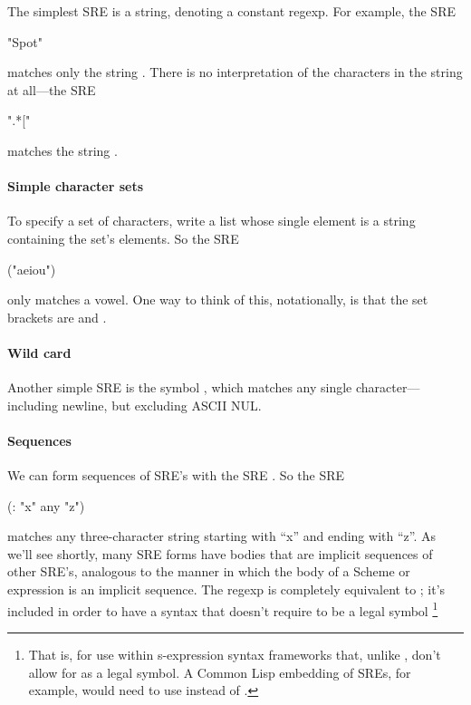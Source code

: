 The simplest SRE is a string, denoting a constant regexp. For example, the SRE
\begin{code}
    "Spot"\end{code}
%
matches only the string 
. 
There is no interpretation of the characters in the string at all---the SRE
\begin{code}
    ".*["\end{code}
%
matches the string .


\paragraph{Simple character sets}

To specify a set of characters, write a list whose single element is
a string containing the set's elements. So the SRE
\begin{code}
    ("aeiou")\end{code}
%
only matches a vowel. One way to think of this, notationally, is that the
set brackets are  and .


\paragraph{Wild card}

Another simple SRE is the symbol , 
which matches any single character---including newline, but excluding
ASCII NUL.


\paragraph{Sequences}

We can form sequences of SRE's with the SRE .
So the SRE
\begin{code}
    (: "x" any "z")\end{code}
%
matches any three-character string starting with ``x'' and ending with ``z''.
As we'll see shortly, many SRE forms have bodies that are implicit sequences of
other SRE's, analogous to the manner in which the body of a Scheme 
 or  expression is an implicit  sequence. 
The regexp  is
completely equivalent to ; 
it's included in order to have a syntax that doesn't require 
\ex{:} to be a legal symbol \footnote{That is, for use within s-expression
syntax frameworks that, unlike \RnRS, don't allow for \ex{:} as a legal symbol. 
A Common Lisp embedding of SREs, for example, would need to use 
 instead of \ex{:}.}


